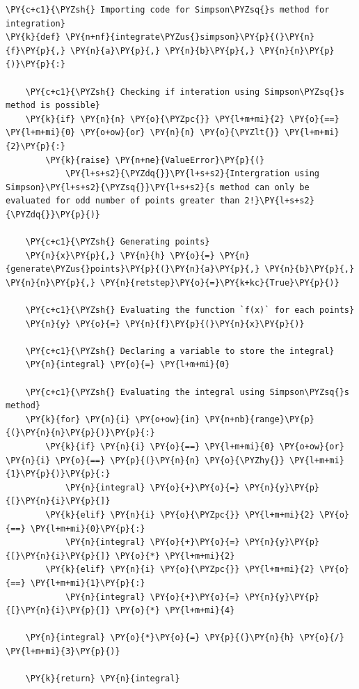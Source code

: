     \begin{tcolorbox}[breakable, size=fbox, boxrule=1pt, pad at break*=1mm,colback=cellbackground, colframe=cellborder]
\begin{Verbatim}[commandchars=\\\{\}]
\PY{c+c1}{\PYZsh{} Importing code for Simpson\PYZsq{}s method for integration}
\PY{k}{def} \PY{n+nf}{integrate\PYZus{}simpson}\PY{p}{(}\PY{n}{f}\PY{p}{,} \PY{n}{a}\PY{p}{,} \PY{n}{b}\PY{p}{,} \PY{n}{n}\PY{p}{)}\PY{p}{:}

    \PY{c+c1}{\PYZsh{} Checking if interation using Simpson\PYZsq{}s method is possible}
    \PY{k}{if} \PY{n}{n} \PY{o}{\PYZpc{}} \PY{l+m+mi}{2} \PY{o}{==} \PY{l+m+mi}{0} \PY{o+ow}{or} \PY{n}{n} \PY{o}{\PYZlt{}} \PY{l+m+mi}{2}\PY{p}{:}
        \PY{k}{raise} \PY{n+ne}{ValueError}\PY{p}{(}
            \PY{l+s+s2}{\PYZdq{}}\PY{l+s+s2}{Intergration using Simpson}\PY{l+s+s2}{\PYZsq{}}\PY{l+s+s2}{s method can only be evaluated for odd number of points greater than 2!}\PY{l+s+s2}{\PYZdq{}}\PY{p}{)}

    \PY{c+c1}{\PYZsh{} Generating points}
    \PY{n}{x}\PY{p}{,} \PY{n}{h} \PY{o}{=} \PY{n}{generate\PYZus{}points}\PY{p}{(}\PY{n}{a}\PY{p}{,} \PY{n}{b}\PY{p}{,} \PY{n}{n}\PY{p}{,} \PY{n}{retstep}\PY{o}{=}\PY{k+kc}{True}\PY{p}{)}

    \PY{c+c1}{\PYZsh{} Evaluating the function `f(x)` for each points}
    \PY{n}{y} \PY{o}{=} \PY{n}{f}\PY{p}{(}\PY{n}{x}\PY{p}{)}

    \PY{c+c1}{\PYZsh{} Declaring a variable to store the integral}
    \PY{n}{integral} \PY{o}{=} \PY{l+m+mi}{0}

    \PY{c+c1}{\PYZsh{} Evaluating the integral using Simpson\PYZsq{}s method}
    \PY{k}{for} \PY{n}{i} \PY{o+ow}{in} \PY{n+nb}{range}\PY{p}{(}\PY{n}{n}\PY{p}{)}\PY{p}{:}
        \PY{k}{if} \PY{n}{i} \PY{o}{==} \PY{l+m+mi}{0} \PY{o+ow}{or} \PY{n}{i} \PY{o}{==} \PY{p}{(}\PY{n}{n} \PY{o}{\PYZhy{}} \PY{l+m+mi}{1}\PY{p}{)}\PY{p}{:}
            \PY{n}{integral} \PY{o}{+}\PY{o}{=} \PY{n}{y}\PY{p}{[}\PY{n}{i}\PY{p}{]}
        \PY{k}{elif} \PY{n}{i} \PY{o}{\PYZpc{}} \PY{l+m+mi}{2} \PY{o}{==} \PY{l+m+mi}{0}\PY{p}{:}
            \PY{n}{integral} \PY{o}{+}\PY{o}{=} \PY{n}{y}\PY{p}{[}\PY{n}{i}\PY{p}{]} \PY{o}{*} \PY{l+m+mi}{2}
        \PY{k}{elif} \PY{n}{i} \PY{o}{\PYZpc{}} \PY{l+m+mi}{2} \PY{o}{==} \PY{l+m+mi}{1}\PY{p}{:}
            \PY{n}{integral} \PY{o}{+}\PY{o}{=} \PY{n}{y}\PY{p}{[}\PY{n}{i}\PY{p}{]} \PY{o}{*} \PY{l+m+mi}{4}

    \PY{n}{integral} \PY{o}{*}\PY{o}{=} \PY{p}{(}\PY{n}{h} \PY{o}{/} \PY{l+m+mi}{3}\PY{p}{)}

    \PY{k}{return} \PY{n}{integral}
\end{Verbatim}
\end{tcolorbox}

